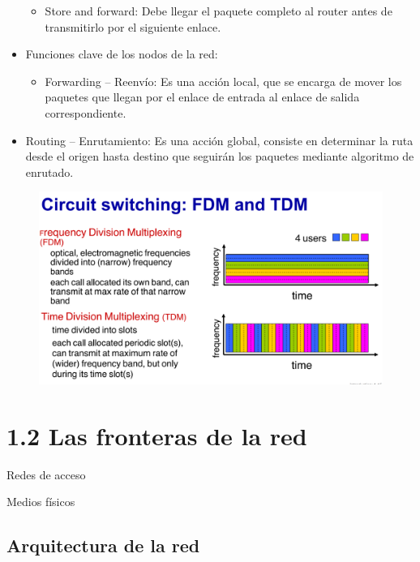 \documentclass[12pt, twoside, openright]{report} %
\begin{document}
\begin{itemize}
    \begin{itemize}
    \item
      Store and forward: Debe llegar el paquete completo al router antes
      de transmitirlo por el siguiente enlace.
    \end{itemize}
  \item
    Funciones clave de los nodos de la red:

    \begin{itemize}
    \item
      Forwarding -- Reenvío: Es una acción local, que se encarga de
      mover los paquetes que llegan por el enlace de entrada al enlace
      de salida correspondiente.
    \end{itemize}
  \item
    Routing -- Enrutamiento: Es una acción global, consiste en
    determinar la ruta desde el origen hasta destino que seguirán los
    paquetes mediante algoritmo de enrutado.
  \end{itemize}
  \begin{figure}[H]
	{\includegraphics[scale=.25]{Untitled.png}}
\end{figure}

\section{1.2 Las fronteras de la red}

  Redes de acceso

  Medios físicos

  \pagebreak
\subsection{Arquitectura de la red}
\end{document}
